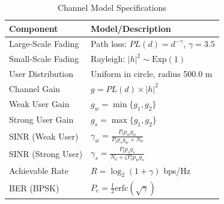 \begin{table}[h]
\centering
\caption{Channel Model Specifications}
\label{tab:channel_model}
\begin{tabular}{|l|l|}
\hline
\textbf{Component} & \textbf{Model/Description} \\
\hline
Large-Scale Fading & Path loss: $PL(d) = d^{-\gamma}$, $\gamma = 3.5$ \\
Small-Scale Fading & Rayleigh: $|h|^2 \sim \text{Exp}(1)$ \\
User Distribution & Uniform in circle, radius 500.0 m \\
Channel Gain & $g = PL(d) \times |h|^2$ \\
\hline
Weak User Gain & $g_w = \min\{g_1, g_2\}$ \\
Strong User Gain & $g_s = \max\{g_1, g_2\}$ \\
\hline
SINR (Weak User) & $\gamma_w = \frac{P_t p_w g_w}{P_t p_s g_w + N_0}$ \\
SINR (Strong User) & $\gamma_s = \frac{P_t p_s g_s}{N_0 + \zeta P_t p_w g_s}$ \\
\hline
Achievable Rate & $R = \log_2(1 + \gamma)$ bps/Hz \\
BER (BPSK) & $P_e = \frac{1}{2}\text{erfc}(\sqrt{\gamma})$ \\
\hline
\end{tabular}
\end{table}
